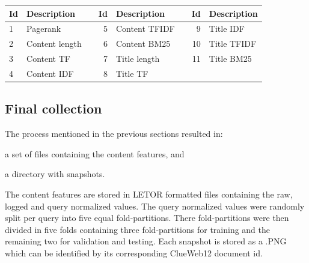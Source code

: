 \begin{table}[h]
\centering
{}  \label{tab:setdescription} 
\begin{tabular}{lllrllrl}
\toprule
Id & Description &\qquad & Id & Description &\qquad & Id & Description    \\ 
\midrule
1  & Pagerank  && 5  & Content TFIDF  && 9  & Title IDF   \\
2  & Content length && 6  & Content BM25   && 10 & Title TFIDF   \\
3  & Content TF  && 7  & Title length && 11 & Title BM25  \\
4  & Content IDF && 8  & Title TF  && & \\
\bottomrule
\end{tabular}
\end{table}





\subsection{Final collection}\label{sec:finalcollection}
The process mentioned in the previous sections resulted in: 
\begin{inparaenum}[(i)]
\item a set of files containing the content features, and
\item a directory with snapshots.
\end{inparaenum}
The content features are stored in LETOR formatted files containing the raw, logged and query normalized values. The query normalized values were randomly split per query into five equal fold-partitions. There fold-partitions were then divided in five folds containing three fold-partitions for training and the remaining two for validation and testing. Each snapshot is stored as a .PNG which can be identified by its corresponding ClueWeb12 document id. 

